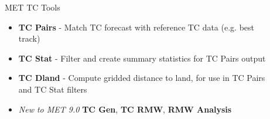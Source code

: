 \documentclass[final]{beamer}
\newlength{\sepwid}
\newlength{\onecolwid}
\newlength{\twocolwid}
\begin{document}
\begin{frame}[containsverbatim]
\begin{columns}[t]
\begin{column}{\onecolwid}
\end{column} %

\begin{column}{\sepwid}\end{column} %

\begin{column}{\twocolwid} %

\begin{columns}[t,totalwidth=\twocolwid] %

\begin{column}{\onecolwid}\vspace{-.6in} %


\end{column} %

\begin{column}{\onecolwid}\vspace{-.6in} %


\end{column} %

\end{columns} %


\begin{alertblock}{MET TC Tools}
\begin{itemize}
\item {\bf TC Pairs} - Match TC forecast with reference TC data
(e.g. best track)
\item {\bf TC Stat} - Filter and create summary statistics
for TC Pairs output
\item {\bf TC Dland} - Compute gridded distance to land,
for use in TC Pairs and TC Stat filters
\item {\it New to MET 9.0}
{\bf TC Gen}, {\bf TC RMW}, {\bf RMW Analysis}
\end{itemize}
\end{alertblock}


\end{column}
\end{columns}
\end{frame}
\end{document}
